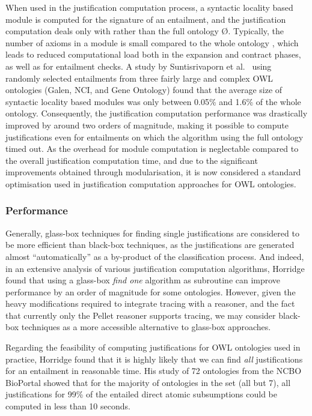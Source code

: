 When used in the justification computation process, a syntactic locality based module \module is computed for the signature of an entailment, and the justification computation deals only with \module rather than the full ontology \O \cite{suntisrivaraporn08aa,du09bn}. Typically, the number of axioms in a module is small compared to the whole ontology \cite{suntisrivaraporn08aa}, which leads to reduced computational load both in the expansion and contract phases, as well as for entailment checks. A study by Suntisrivaporn et al.\ \cite{suntisrivaraporn08yq} using randomly selected entailments from three fairly large and complex OWL ontologies (Galen, NCI, and Gene Ontology) found that the average size of syntactic locality based modules was only between 0.05\% and 1.6\% of the whole ontology. Consequently, the justification computation performance was drastically improved by around two orders of magnitude, making it possible to compute justifications even for entailments on which the algorithm using the full ontology timed out. As the overhead for module computation is neglectable compared to the overall justification computation time, and due to the significant improvements obtained through modularisation, it is now considered a standard optimisation used in justification computation approaches for OWL ontologies.

\subsubsection{Performance}

Generally, glass-box techniques for finding single justifications are considered to be more efficient than black-box techniques, as the justifications are generated almost \enquote{automatically} as a by-product of the classification process. And indeed, in an extensive analysis of various justification computation algorithms, Horridge \cite{horridge11ab} found that using a glass-box \emph{find one} algorithm as subroutine can improve performance by an order of magnitude for some ontologies. However, given the heavy modifications required to integrate tracing with a reasoner, and the fact that currently only the Pellet reasoner supports tracing, we may consider black-box techniques as a more accessible alternative to glass-box approaches.

Regarding the feasibility of computing justifications for OWL ontologies used in practice, Horridge \cite{horridge11ab} found that it is highly likely that we can find \emph{all} justifications for an entailment in reasonable time. His study of 72 ontologies from the NCBO BioPortal showed that for the majority of ontologies in the set (all but 7), all justifications for 99\% of the entailed direct atomic subsumptions could be computed in less than 10 seconds.


